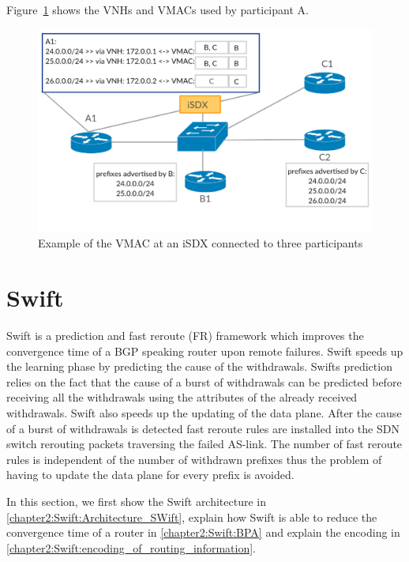 Figure~\ref{fig:isdx_vmac} shows the VNHs and VMACs used by participant A.

\begin{figure}[h]
\center
\includegraphics[scale = 0.33]{Figures/sdx_vmac3.pdf}
\caption{Example of the VMAC at an iSDX connected to three participants}
\label{fig:isdx_vmac}
\end{figure}

\newpage

\section{\label{chapter2:Swift}Swift}

Swift is a prediction and fast reroute (FR) framework which improves the convergence time of a BGP speaking router upon remote failures. Swift speeds up the learning phase by predicting the cause of the withdrawals. Swifts prediction relies on the fact that the cause of a burst of withdrawals can be predicted before receiving all the withdrawals using the attributes of the already received withdrawals. Swift also speeds up the updating of the data plane. After the cause of a burst of withdrawals is detected fast reroute rules are installed into the SDN switch rerouting packets traversing the failed AS-link. The number of fast reroute rules is independent of the number of withdrawn prefixes thus the problem of having to update the data plane for every prefix is avoided. 

In this section, we first show the Swift architecture in \ref{chapter2:Swift:Architecture_SWift}, explain how Swift is able to reduce the convergence time of a router in \ref{chapter2:Swift:BPA} and explain the encoding in \ref{chapter2:Swift:encoding_of_routing_information}.

